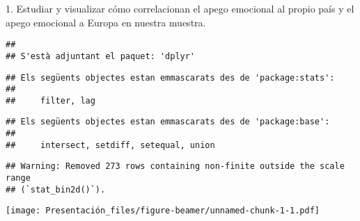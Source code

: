 \documentclass[
  ignorenonframetext,
]{beamer}
\begin{document}
\begin{frame}[fragile]{1. Estudiar y visualizar cómo correlacionan el
apego emocional al propio país y el apego emocional a Europa en nuestra
muestra.}
\label{estudiar-y-visualizar-cuxf3mo-correlacionan-el-apego-emocional-al-propio-pauxeds-y-el-apego-emocional-a-europa-en-nuestra-muestra.}
\begin{verbatim}
## 
## S'està adjuntant el paquet: 'dplyr'
\end{verbatim}

\begin{verbatim}
## Els següents objectes estan emmascarats des de 'package:stats':
## 
##     filter, lag
\end{verbatim}

\begin{verbatim}
## Els següents objectes estan emmascarats des de 'package:base':
## 
##     intersect, setdiff, setequal, union
\end{verbatim}

\begin{verbatim}
## Warning: Removed 273 rows containing non-finite outside the scale range
## (`stat_bin2d()`).
\end{verbatim}

\texttt{[image: Presentación\_files/figure-beamer/unnamed-chunk-1-1.pdf]}
\end{frame}
\end{document}
